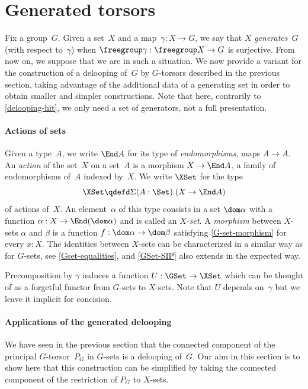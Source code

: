 \section{Generated torsors}
\label{generated-torsors}
Fix a group~$G$. Given a set~$X$ and a map~$\gamma:X\to G$, we say that $X$ \emph{generates}~$G$ (with respect to~$\gamma$) when $\freegroup\gamma:\freegroup X\to G$ is surjective.
From now on, we suppose that we are in such a situation.
%
We now provide a variant for the construction of a delooping of~$G$ by $G$-torsors described in the
previous section, taking advantage of the additional data of a generating
set in order to obtain smaller and simpler constructions.
%
Note that here, contrarily to \cref{delooping-hit}, we only need a set of
generators, not a full presentation.

\paragraph{Actions of sets} 
Given a type~$A$, we write $\End A$ for its type of \emph{endomorphisms}, \ie
maps $A\to A$. An \emph{action} of the set~$X$ on a set~$A$ is a morphism
$X\to\End A$, \ie a family of endomorphisms of~$A$ indexed by~$X$.
%
We write $\XSet$ for the type
\[
  \XSet
  \qdefd
  \Sigma(A:\Set).(X\to\End A)
  \]
of actions of~$X$. An element~$\alpha$ of this type consists in a set $\dom\alpha$ with a function
$\alpha:X\to\End(\dom\alpha)$ and is called an \emph{$X$-set}. A
\emph{morphism} between $X$-sets $\alpha$ and $\beta$ is a function
$f:\dom\alpha\to\dom\beta$ satisfying \cref{G-set-morphism} for every $x:X$.
%
The identities between $X$-sets can be characterized in a similar way as for
$G$-sets, see \cref{Gset-equalities}, and \cref{GSet-SIP} also extends in the
expected way.

Precomposition by $\gamma$ induces a function $U:\GSet\to\XSet$ which can be
thought of as a forgetful functor from $G$-sets to $X$-sets. Note that $U$
depends on~$\gamma$ but we leave it implicit for concision.

\paragraph{Applications of the generated delooping}
We have seen in the previous section that the connected
component of the principal $G$-torsor~$P_G$ in $G$-sets is a delooping
of~$G$. Our aim in this section is to show here that this construction can be
simplified by taking the connected component of the restriction of $P_G$ to $X$-sets.

